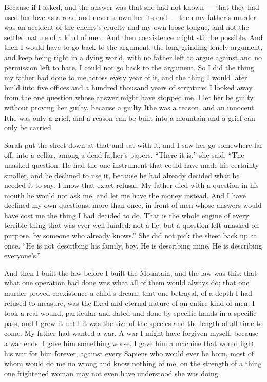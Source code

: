 Because if I asked, and the answer was that she had not known --- that they had used her love as a road and never shown her its end --- then my father's murder was an accident of the enemy's cruelty and my own loose tongue, and not the settled nature of a kind of men. And then coexistence might still be possible. And then I would have to go back to the argument, the long grinding lonely argument, and keep being right in a dying world, with no father left to argue against and no permission left to hate. I could not go back to the argument. So I did the thing my father had done to me across every year of it, and the thing I would later build into five offices and a hundred thousand years of scripture: I looked away from the one question whose answer might have stopped me. I let her be guilty without proving her guilty, because a guilty Ithe was a reason, and an innocent Ithe was only a grief, and a reason can be built into a mountain and a grief can only be carried.\par

\ornament

Sarah put the sheet down at that and sat with it, and I saw her go somewhere far off, into a cellar, among a dead father's papers. ``There it is,'' she said. ``The unasked question. He had the one instrument that could have made his certainty smaller, and he declined to use it, because he had already decided what he needed it to say. I know that exact refusal. My father died with a question in his mouth he would not ask me, and let me have the money instead. And I have declined my own questions, more than once, in front of men whose answers would have cost me the thing I had decided to do. That is the whole engine of every terrible thing that was ever well funded: not a lie, but a question left unasked on purpose, by someone who already knows.'' She did not pick the sheet back up at once. ``He is not describing his family, boy. He is describing mine. He is describing everyone's.''\par

\ornament

And then I built the law before I built the Mountain, and the law was this: that what one operation had done was what all of them would always do; that one murder proved coexistence a child's dream; that one betrayal, of a depth I had refused to measure, was the fixed and eternal nature of an entire kind of men. I took a real wound, particular and dated and done by specific hands in a specific pass, and I grew it until it was the size of the species and the length of all time to come. My father had wanted a war. A war I might have forgiven myself, because a war ends. I gave him something worse. I gave him a machine that would fight his war for him forever, against every Sapiens who would ever be born, most of whom would do me no wrong and know nothing of me, on the strength of a thing one frightened woman may not even have understood she was doing.\par

